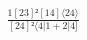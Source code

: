\documentclass[varwidth, border=5pt]{standalone}
\begin{document}
\begin{my}
$\begin{gathered}
\scriptscriptstyle\frac{1[23]²[14]⟨24⟩}{[24]²⟨4|1+2|4]}
\end{gathered}$
\end{my}
\end{document}
